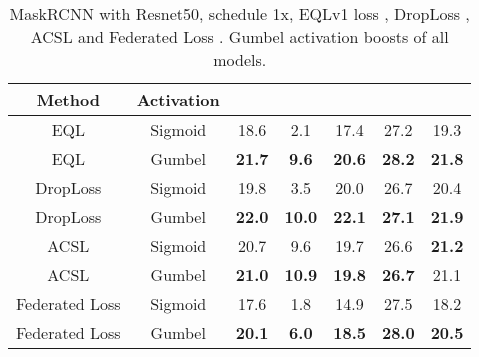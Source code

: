 \documentclass[runningheads]{llncs}
\begin{document}
\begin{table}
    \centering
    \caption{MaskRCNN with Resnet50, schedule 1x, EQLv1 loss \cite{tan2020equalization}, DropLoss \cite{hsieh2021droploss}, ACSL \cite{wang2021adaptive} and Federated Loss \cite{zhou2021probablistic}. Gumbel activation boosts  of all models.}
    \begin{tabular}{c|c|c|c|c|c|c}
         Method&Activation&&&&&  \\
         \hline
         EQL\cite{tan2021equalization}&Sigmoid& 18.6&2.1&17.4&27.2&19.3 \\
          EQL&Gumbel&\textbf{21.7}&\textbf{9.6}&\textbf{20.6}&\textbf{28.2}&\textbf{21.8}\\
         \hline
         DropLoss\cite{hsieh2021droploss}&Sigmoid& 19.8&3.5&20.0&26.7&20.4 \\
         DropLoss&Gumbel&\textbf{22.0}&\textbf{10.0}&\textbf{22.1}&\textbf{27.1}&\textbf{21.9} \\
         \hline
         ACSL \cite{wang2021adaptive} &Sigmoid  &20.7  &9.6  &19.7 &26.6&\textbf{21.2}\\
         ACSL &Gumbel &\textbf{21.0} &\textbf{10.9}&\textbf{19.8}&\textbf{26.7}&21.1\\
         \hline
         Federated Loss \cite{zhou2021probablistic} &Sigmoid &17.6  &1.8 &14.9&27.5&18.2\\
         Federated Loss &Gumbel &\textbf{20.1}&\textbf{6.0}&\textbf{18.5}&\textbf{28.0}&\textbf{20.5}\\
    \end{tabular}
    \label{tab:detailed_gumbel_sota}
\end{table}
\end{document}
